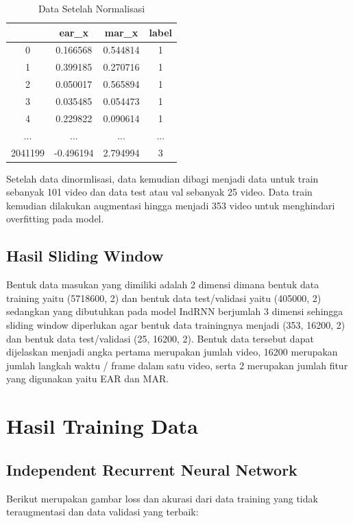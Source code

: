 \begin{longtable}{|c|c|c|c|}
  \caption{Data Setelah Normalisasi}
  \label{tb:NaNdata}                                             \\
  \hline
  \rowcolor[HTML]{C0C0C0}
  \textbf{} & \textbf{ear\_x} & \textbf{mar\_x} & \textbf{label} \\
  \hline
  0         & 0.166568        & 0.544814        & 1              \\
  1         & 0.399185        & 0.270716        & 1              \\
  2         & 0.050017        & 0.565894        & 1              \\
  3         & 0.035485        & 0.054473        & 1              \\
  4         & 0.229822        & 0.090614        & 1              \\
  ...       & ...             & ...             & ...            \\
  2041199   & -0.496194       & 2.794994        & 3              \\
  \hline
\end{longtable}

Setelah data dinormlisasi, data kemudian dibagi menjadi data untuk train sebanyak 101 video
dan data test atau val sebanyak 25 video. Data train kemudian dilakukan augmentasi hingga
menjadi 353 video untuk menghindari overfitting pada model.

\subsection{Hasil Sliding Window}

Bentuk data masukan yang dimiliki adalah 2 dimensi dimana bentuk data training yaitu (5718600, 2) dan
bentuk data test/validasi yaitu (405000, 2) sedangkan yang dibutuhkan pada model IndRNN berjumlah 3 dimensi sehingga sliding window
diperlukan agar bentuk data trainingnya menjadi (353, 16200, 2) dan bentuk data test/validasi (25, 16200, 2). Bentuk data tersebut dapat
dijelaskan menjadi angka pertama merupakan jumlah video, 16200 merupakan jumlah langkah waktu / frame dalam satu video, serta 2
merupakan jumlah fitur yang digunakan yaitu EAR dan MAR.

\section{Hasil Training Data}
\subsection{Independent Recurrent Neural Network}
Berikut merupakan gambar loss dan akurasi dari data training yang tidak teraugmentasi dan
data validasi yang terbaik:

